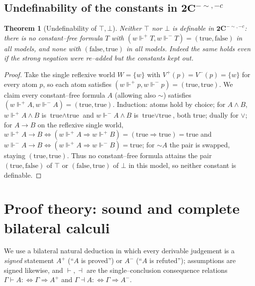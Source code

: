 \documentclass{amsart}
\theoremstyle{plain}
\newtheorem{theorem}{Theorem}
\theoremstyle{definition}
\newcommand{\To}{\rightarrow}
\newcommand{\Cii}{\mathbf{2C}^{-{\sim},-c}}    %
\newcommand{\fp}{\Vdash^{+}}
\newcommand{\fm}{\Vdash^{-}}
\newcommand{\proves}{\vdash}
\newcommand{\refutes}{\dashv}
\begin{document}
\subsection{Undefinability of the constants in $\Cii$}

\begin{theorem}[Undefinability of $\top,\bot$]\label{thm:undefconst}
Neither $\top$ nor $\bot$ is definable in $\Cii$: there is no constant--free
formula $T$ with $(w\fp T,w\fm T)=(\text{true},\text{false})$ in all models, and
none with $(\text{false},\text{true})$ in all models. Indeed the same holds even
if the strong negation were re--added but the constants kept out.
\end{theorem}
\begin{proof}
Take the single reflexive world $W=\{w\}$ with $V^{+}(p)=V^{-}(p)=\{w\}$ for
every atom $p$, so each atom satisfies $(w\fp p,w\fm p)=(\text{true},\text{true})$.
We claim every constant--free formula $A$ (allowing also ${\sim}$) satisfies
$(w\fp A,w\fm A)=(\text{true},\text{true})$. Induction: atoms hold by choice; for
$A\wedge B$, $w\fp A\wedge B$ is $\text{true}\wedge\text{true}$ and $w\fm A\wedge
B$ is $\text{true}\vee\text{true}$, both true; dually for $\vee$; for $A\To B$ on
the reflexive single world, $w\fp A\To B\iff(w\fp A\Rightarrow w\fp B)=
(\text{true}\Rightarrow\text{true})=\text{true}$ and $w\fm A\To B\iff(w\fp
A\Rightarrow w\fm B)=\text{true}$; for ${\sim}A$ the pair is swapped, staying
$(\text{true},\text{true})$. Thus no constant--free formula attains the pair
$(\text{true},\text{false})$ of $\top$ or $(\text{false},\text{true})$ of $\bot$
in this model, so neither constant is definable.
\end{proof}

\section{Proof theory: sound and complete bilateral calculi}\label{sec:proof}

We use a bilateral natural deduction in which every derivable judgement is a
\emph{signed} statement $A^{+}$ (``$A$ is proved'') or $A^{-}$ (``$A$ is
refuted''); assumptions are signed likewise, and $\proves,\refutes$ are the
single--conclusion consequence relations
$\Gamma\proves A:\!\!\iff \Gamma\Rightarrow A^{+}$ and
$\Gamma\refutes A:\!\!\iff\Gamma\Rightarrow A^{-}$.
\end{document}
